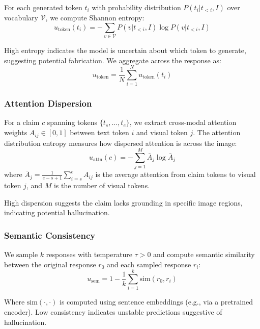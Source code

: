 \documentclass[12pt]{article}
\begin{document}
For each generated token $t_i$ with probability distribution $P(t_i | t_{<i}, I)$ over vocabulary $\mathcal{V}$, we compute Shannon entropy:
\begin{equation}
u_{\text{token}}(t_i) = -\sum_{v \in \mathcal{V}} P(v | t_{<i}, I) \log P(v | t_{<i}, I)
\end{equation}

High entropy indicates the model is uncertain about which token to generate, suggesting potential fabrication. We aggregate across the response as:
\begin{equation}
u_{\text{token}} = \frac{1}{N} \sum_{i=1}^{N} u_{\text{token}}(t_i)
\end{equation}

\subsubsection{Attention Dispersion}

For a claim $c$ spanning tokens $\{t_s, \ldots, t_e\}$, we extract cross-modal attention weights $A_{ij} \in [0,1]$ between text token $i$ and visual token $j$. The attention distribution entropy measures how dispersed attention is across the image:
\begin{equation}
u_{\text{attn}}(c) = -\sum_{j=1}^{M} \bar{A}_j \log \bar{A}_j
\end{equation}
where $\bar{A}_j = \frac{1}{e-s+1} \sum_{i=s}^{e} A_{ij}$ is the average attention from claim tokens to visual token $j$, and $M$ is the number of visual tokens.

High dispersion suggests the claim lacks grounding in specific image regions, indicating potential hallucination.

\subsubsection{Semantic Consistency}

We sample $k$ responses with temperature $\tau > 0$ and compute semantic similarity between the original response $r_0$ and each sampled response $r_i$:
\begin{equation}
u_{\text{sem}} = 1 - \frac{1}{k} \sum_{i=1}^{k} \text{sim}(r_0, r_i)
\end{equation}

Where $\text{sim}(\cdot, \cdot)$ is computed using sentence embeddings (e.g., via a pretrained encoder). Low consistency indicates unstable predictions suggestive of hallucination.
\end{document}
